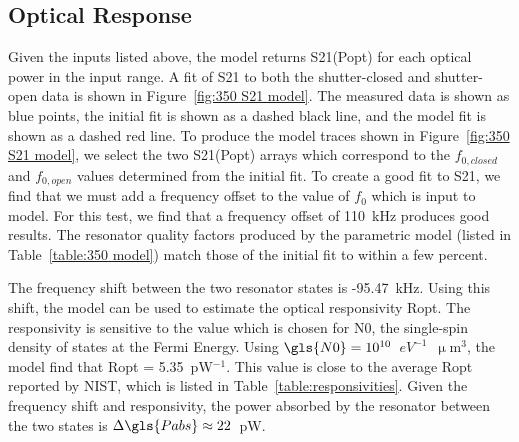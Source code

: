 \subsection{Optical Response}

Given the inputs listed above, the model returns \gls{S21}(\gls{Popt}) for each optical power in the input range. A fit of \gls{S21} to both the shutter-closed and shutter-open data is shown in Figure~\ref{fig:350 S21 model}. The measured data is shown as blue points, the initial fit is shown as a dashed black line, and the model fit is shown as a dashed red line. To produce the model traces shown in Figure~\ref{fig:350 S21 model}, we select the two \gls{S21}(\gls{Popt}) arrays which correspond to the $f_{0,closed}$ and $f_{0,open}$ values determined from the initial fit. To create a good fit to \gls{S21}, we find that we must add a frequency offset to the value of $f_{0}$ which is input to model. For this test, we find that a frequency offset of 110~kHz produces good results. The resonator quality factors produced by the parametric model (listed in Table~\ref{table:350 model}) match those of the initial fit to within a few percent.

The frequency shift between the two resonator states is -95.47~kHz. Using this shift, the model can be used to estimate the optical responsivity \gls{Ropt}. The responsivity is sensitive to the value which is chosen for \gls{N0}, the single-spin density of states at the Fermi Energy. Using $\gls{N0} = 10^{10}$~$eV^{-1}$~$\upmu$m$^{3}$, the model find that \gls{Ropt} = 5.35~pW$^{-1}$. This value is close to the average \gls{Ropt} reported by NIST, which is listed in Table~\ref{table:responsivities}. Given the frequency shift and responsivity, the power absorbed by the resonator between the two states is $\Delta \gls{Pabs} \approx 22$~pW.

